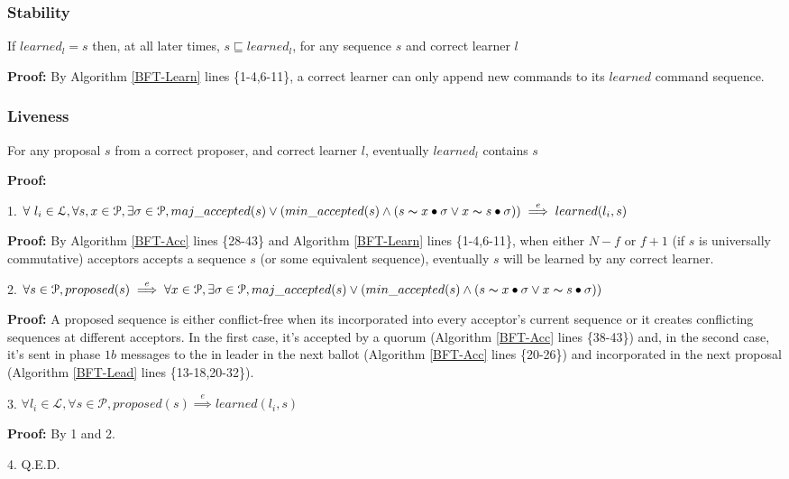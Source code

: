 \subsubsection{Stability}
\begin{theorem}
If $learned_l = s$ then, at all later times, $s \sqsubseteq learned_l$, for any sequence $s$ and correct learner $l$ \par
\end{theorem} 
\textbf{Proof:} By Algorithm \ref{BFT-Learn} lines \{1-4,6-11\}, a correct learner can only append new commands to its $learned$ command sequence.

\subsubsection{Liveness}
\begin{theorem}
For any proposal $s$ from a correct proposer, and correct learner $l$, eventually $learned_l$ contains $s$\par
\end{theorem} 
\parbox{\linewidth}{\textbf{Proof:}} \par
\parbox{\linewidth}{\strut1. $\forall\ l_i \in \mathcal{L},\forall s,x \in \mathcal{P}, \exists \sigma \in \mathcal{P}, maj\_accepted(s) \lor (min\_accepted(s) \land  (s \thicksim x \bullet \sigma \lor x \thicksim s \bullet \sigma))\overset{e}{\implies} learned(l_i,s)$}\par
\indent\indent\parbox{\linewidth}{\strut\textbf{Proof:} By Algorithm \ref{BFT-Acc} lines \{28-43\} and Algorithm \ref{BFT-Learn} lines \{1-4,6-11\}, when either $N-f$ or $f+1$ (if $s$ is universally commutative) acceptors accepts a sequence $s$ (or some equivalent sequence), eventually $s$ will be learned by any correct learner.}\par
\parbox{\linewidth}{\strut2. $\forall s \in \mathcal{P}, proposed(s) \overset{e}{\implies} \forall x \in \mathcal{P}, \exists \sigma \in \mathcal{P}, maj\_accepted(s) \lor (min\_accepted(s) \land  (s \thicksim x \bullet \sigma \lor x \thicksim s \bullet \sigma))$} \par
\indent\indent\parbox{\linewidth}{\strut\textbf{Proof:} A proposed sequence is either conflict-free when its incorporated into every acceptor's current sequence or it creates conflicting sequences at different acceptors. In the first case, it's accepted by a quorum (Algorithm \ref{BFT-Acc} lines \{38-43\}) and, in the second case, it's sent in phase $1b$ messages to the in leader in the next ballot (Algorithm \ref{BFT-Acc} lines \{20-26\}) and incorporated in the next proposal (Algorithm \ref{BFT-Lead} lines \{13-18,20-32\}).} \par
\parbox{\linewidth}{\strut3. $\forall l_i \in \mathcal{L}, \forall s \in \mathcal{P}, proposed(s) \overset{e}{\implies} learned(l_i,s)$} \par
\indent\indent\parbox{\linewidth}{\strut\textbf{Proof:} By 1 and 2.} \par
\parbox{\linewidth}{\strut4. Q.E.D.}